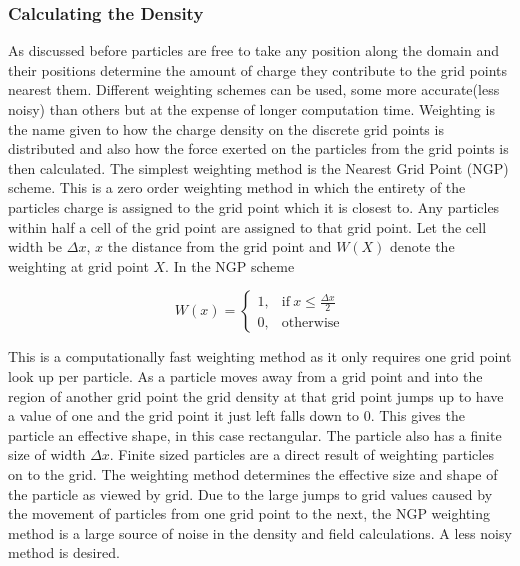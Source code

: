 \documentclass[12pt]{article}
\def\be{\begin{equation}}
\def\ee{\end{equation}}
\begin{document}
\subsubsection{Calculating the Density}
As discussed before particles are free to take any position along the domain and their positions determine the amount of charge they contribute to the grid points nearest them. Different weighting schemes can be used, some more accurate(less noisy) than others but at the expense of longer computation time. Weighting is the name given to how the charge density on the discrete grid points is distributed and also how the force exerted on the particles from the grid points is then calculated. The simplest weighting method is the Nearest Grid Point (NGP) scheme. This is a zero order weighting method in which the entirety of the particles charge is assigned to the grid point which it is closest to. Any particles within half a cell of the grid point are assigned to that grid point. Let the cell width be $\Delta x$, $x$ the distance from the grid point and $W(X)$ denote the weighting at grid point $X$. In the NGP scheme 

\be
    W(x)=
    \begin{cases}
      1, & \text{if}\ x \leq \frac{\Delta x }{2}   \\
      0, & \text{otherwise}
    \end{cases}
\ee

This is a computationally fast weighting method as it only requires one grid point look up per particle. As a particle moves away from a grid point and into the region of another grid point the grid density at that grid point jumps up to have a value of one and the grid point it just left falls down to 0. This gives the particle an effective shape, in this case rectangular. The particle also has a finite size of width $\Delta x$. Finite sized particles are a direct result of weighting particles on to the grid. The weighting method determines the effective size and shape of the particle as viewed by grid. Due to the large jumps to grid values caused by the movement of particles from one grid point to the next, the NGP weighting method is a large source of noise in the density and field calculations. A less noisy method is desired. 
\end{document}
